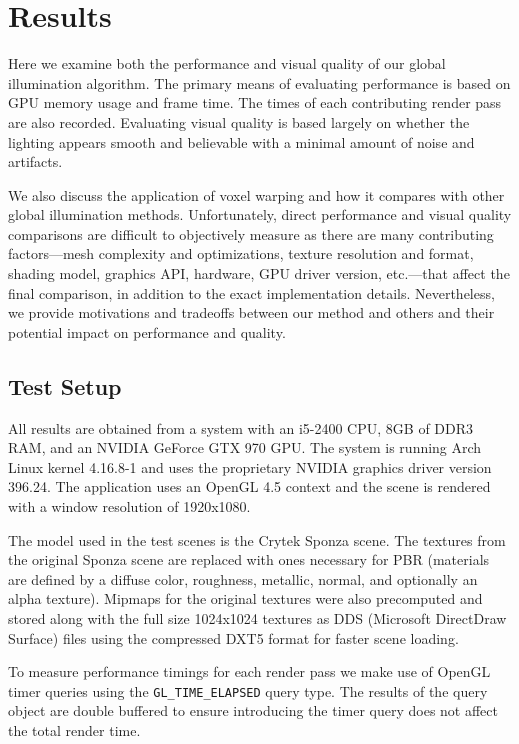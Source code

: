 \chapter{Results}

Here we examine both the performance and visual quality of our global illumination algorithm. The primary means of evaluating performance is based on GPU memory usage and frame time. The times of each contributing render pass are also recorded. Evaluating visual quality is based largely on whether the lighting appears smooth and believable with a minimal amount of noise and artifacts.

We also discuss the application of voxel warping and how it compares with other global illumination methods. Unfortunately, direct performance and visual quality comparisons are difficult to objectively measure as there are many contributing factors---mesh complexity and optimizations, texture resolution and format, shading model, graphics API, hardware, GPU driver version, etc.---that affect the final comparison, in addition to the exact implementation details. Nevertheless, we provide motivations and tradeoffs between our method and others and their potential impact on performance and quality.

\section{Test Setup}
All results are obtained from a system with an i5-2400 CPU, 8GB of DDR3 RAM, and an NVIDIA GeForce GTX 970 GPU. The system is running Arch Linux kernel 4.16.8-1 and uses the proprietary NVIDIA graphics driver version 396.24. The application uses an OpenGL 4.5 context and the scene is rendered with a window resolution of 1920x1080.

The model used in the test scenes is the Crytek Sponza scene. The textures from the original Sponza scene are replaced with ones necessary for PBR (materials are defined by a diffuse color, roughness, metallic, normal, and optionally an alpha texture). Mipmaps for the original textures were also precomputed and stored along with the full size 1024x1024 textures as DDS (Microsoft DirectDraw Surface) files using the compressed DXT5 format for faster scene loading.

To measure performance timings for each render pass we make use of OpenGL timer queries using the \verb#GL_TIME_ELAPSED# query type. The results of the query object are double buffered to ensure introducing the timer query does not affect the total render time.

